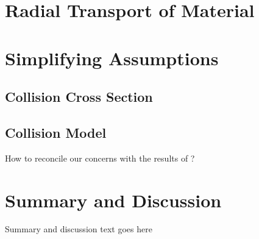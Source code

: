 \documentclass[onecolumn]{aastex63}
\begin{document}


\section{Radial Transport of Material}


\section{Simplifying Assumptions}\label{sec:assump}

\subsection{Collision Cross Section}


\subsection{Collision Model}


How to reconcile our concerns with the results of \citet{wallace17}?

\section{Summary and Discussion} \label{sec:discuss}

Summary and discussion text goes here



\clearpage
\end{document}
